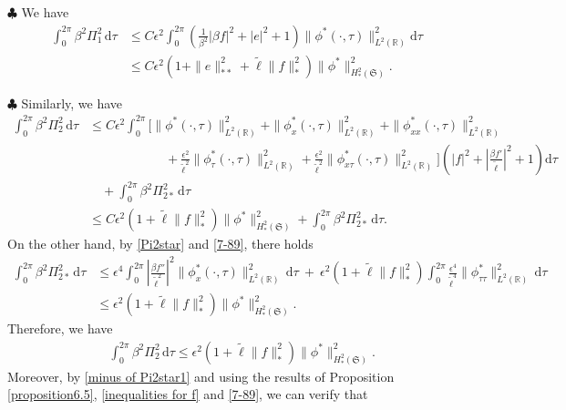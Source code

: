 \documentclass[10pt, reqno]{amsart}
\numberwithin{equation}{section}
\theoremstyle{definition}
\begin{document}
{\smallskip\noindent$\clubsuit$
We have
\begin{align*}
\int_0^{2\pi} \beta^2\Pi_1^2 \,{\mathrm d}\tau
& \leq C \epsilon^2 \int_0^{2\pi} \left(\frac{1}{\beta^2} \left|\beta f\right|^2+|e|^2 + 1\right) \|\phi^*(\cdot, \tau)\|^2_{L^2({\mathbb R})}{\mathrm d}\tau
\nonumber\\[2mm]
& \leq
C \epsilon^2\left(1+\|e\|_{**}^2+ {\tilde\ell} \|f\|_*^2\right)\|\phi^*\|_{H^2_*(\mathfrak S)}^2.
\end{align*}


\smallskip\noindent$\clubsuit$
Similarly, we have
\begin{align*}
 \int_0^{2\pi} \beta^2\Pi_2^2 \,{\mathrm d}\tau
& \leq C \epsilon^2 \int_0^{2\pi}
 \Bigg[\|\phi^*(\cdot, \tau)\|^2_{L^2({\mathbb R})} + \|\phi_x^*(\cdot, \tau)\|^2_{L^2({\mathbb R})}+\|\phi^*_{xx}(\cdot, \tau)\|^2_{L^2({\mathbb R})}
\nonumber\\[2mm]
& \qquad\qquad\qquad
 + \frac{\epsilon^2}{\tilde\ell^2}\|\phi^*_{\tau}(\cdot, \tau)\|^2_{L^2({\mathbb R})}+ \frac{\epsilon^2}{\tilde\ell^2}\|\phi^*_{x\tau}(\cdot, \tau)\|^2_{L^2({\mathbb R})} \Bigg] \left(\left|f\right|^2 + \left|\frac{{\beta f}'}{\tilde\ell}\right|^2 + 1\right) {\mathrm d}\tau
\nonumber\\[2mm]
& \quad+ \int_0^{2\pi} \beta^2\Pi_{2*}^2 \,{\mathrm d}\tau
\nonumber\\[2mm]
& \leq C
 \epsilon^2\left(1 + {\tilde\ell} \|f\|_*^2\right)\|\phi^*\|_{H^2_*(\mathfrak S)}^2+ \int_0^{2\pi} \beta^2\Pi_{2*}^2 \,{\mathrm d}\tau.
\end{align*}
On the other hand, by \eqref{Pi2star} and \eqref{7-89}, there holds
\begin{align*}
\int_0^{2\pi} \beta^2\Pi_{2*}^2 \,{\mathrm d}\tau
&
\leq \epsilon^4 \int_0^{2\pi} \left|\frac{{\beta f}''}{\tilde\ell^2}\right|^2 \|\phi^*_x(\cdot, \tau)\|^2_{L^2({\mathbb R})}\,{\mathrm d}\tau
\ +\
\epsilon^2 \left(1 + {\tilde\ell} \|f\|_*^2\right) \int_0^{2\pi} \frac{\epsilon^4}{\tilde\ell^4}\|\phi^*_{\tau\tau}\|^2_{L^2({\mathbb R})} \,{\mathrm d}\tau
\nonumber\\[2mm]
&
\leq \epsilon^2\left(1 + {\tilde\ell} \|f\|_*^2\right)\|\phi^*\|_{H^2_*(\mathfrak S)}^2.
\end{align*}
Therefore, we have
\begin{align*}
& \int_0^{2\pi} \beta^2\Pi_2^2 \,{\mathrm d}\tau \leq \epsilon^2\left(1 + {\tilde\ell} \|f\|_*^2\right)\|\phi^*\|_{H^2_*(\mathfrak S)}^2.
\end{align*}
Moreover, by \eqref{minus of Pi2star1} and using the results of Proposition \ref{proposition6.5}, \eqref{inequalities for f} and \eqref{7-89}, we can verify that
}
\end{document}
